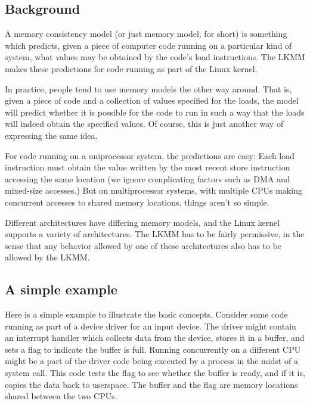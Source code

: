\subsection{Background}
\label{sec:docs:explanation:Background}

A memory consistency model (or just memory model, for short) is
something which predicts, given a piece of computer code running on a
particular kind of system, what values may be obtained by the code's
load instructions.
The LKMM makes these predictions for code running as part of the Linux
kernel.

In practice, people tend to use memory models the other way around.
That is, given a piece of code and a collection of values specified
for the loads, the model will predict whether it is possible for the
code to run in such a way that the loads will indeed obtain the
specified values.
Of course, this is just another way of expressing the same idea.

For code running on a uniprocessor system, the predictions are easy:
Each load instruction must obtain the value written by the most recent
store instruction accessing the same location (we ignore complicating
factors such as DMA and mixed-size accesses.)
But on multiprocessor systems, with multiple CPUs making concurrent
accesses to shared memory locations, things aren't so simple.

Different architectures have differing memory models, and the Linux
kernel supports a variety of architectures.
The LKMM has to be fairly permissive, in the sense that any behavior
allowed by one of these architectures also has to be allowed by the LKMM\@.


\subsection{A simple example}
\label{sec:docs:explanation:A simple example}

Here is a simple example to illustrate the basic concepts.
Consider some code running as part of a device driver for an input device.
The driver might contain an interrupt handler which collects data from the
device, stores it in a buffer, and sets a flag to indicate the buffer
is full.
Running concurrently on a different CPU might be a part of the driver
code being executed by a process in the midst of a 
system call.
This code tests the flag to see whether the buffer is ready, and if it is,
copies the data back to userspace.
The buffer and the flag are memory locations shared between the two CPUs.

